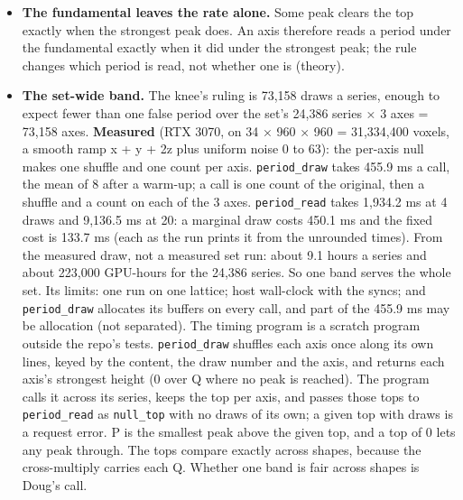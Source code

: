 \begin{itemize}
with each comparison a 128-bit cross-multiply. A period P also peaks at 2P and 3P with heights matching P's, and the strongest peak picked a multiple; the smallest peak above the top picks P. An empty band, where no draw reached a peak, or a given top of 0 lets any peak through, and the smallest peak is P. When none clears, P = 0 and the reported candidate is the strongest peak (the largest height, the smallest p on a tie). A lag that makes no peak at p and 2p is never a candidate. Nothing is rounded, and no constant is written in.
\item \textbf{The fundamental leaves the rate alone.} Some peak clears the top exactly when the strongest peak does. An axis therefore reads a period under the fundamental exactly when it did under the strongest peak; the rule changes which period is read, not whether one is (theory).
\item \textbf{The set-wide band.} The knee's ruling is 73,158 draws a series, enough to expect fewer than one false period over the set's 24,386 series × 3 axes = 73,158 axes. \textbf{Measured} (RTX 3070, on 34 × 960 × 960 = 31,334,400 voxels, a smooth ramp x + y + 2z plus uniform noise 0 to 63): the per-axis null makes one shuffle and one count per axis. \texttt{period\_\allowbreak{}draw} takes 455.9 ms a call, the mean of 8 after a warm-up; a call is one count of the original, then a shuffle and a count on each of the 3 axes. \texttt{period\_\allowbreak{}read} takes 1,934.2 ms at 4 draws and 9,136.5 ms at 20: a marginal draw costs 450.1 ms and the fixed cost is 133.7 ms (each as the run prints it from the unrounded times). From the measured draw, not a measured set run: about 9.1 hours a series and about 223,000 GPU-hours for the 24,386 series. So one band serves the whole set. Its limits: one run on one lattice; host wall-clock with the syncs; and \texttt{period\_\allowbreak{}draw} allocates its buffers on every call, and part of the 455.9 ms may be allocation (not separated). The timing program is a scratch program outside the repo's tests. \texttt{period\_\allowbreak{}draw} shuffles each axis once along its own lines, keyed by the content, the draw number and the axis, and returns each axis's strongest height (0 over Q where no peak is reached). The program calls it across its series, keeps the top per axis, and passes those tops to \texttt{period\_\allowbreak{}read} as \texttt{null\_\allowbreak{}top} with no draws of its own; a given top with draws is a request error. P is the smallest peak above the given top, and a top of 0 lets any peak through. The tops compare exactly across shapes, because the cross-multiply carries each Q. Whether one band is fair across shapes is Doug's call.

\end{itemize}
